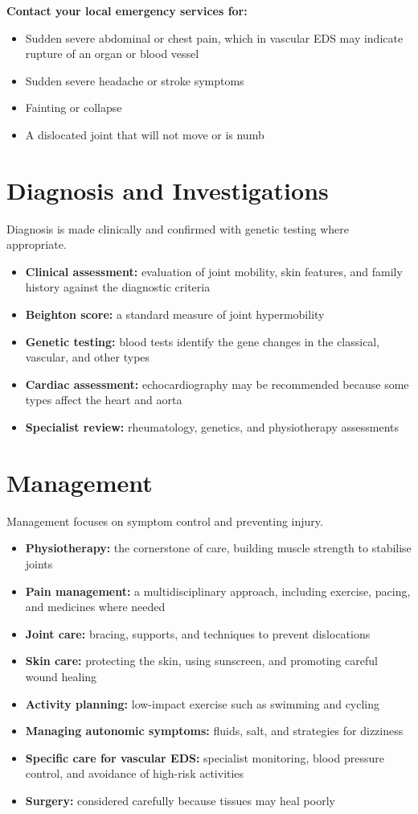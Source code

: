 \textbf{Contact your local emergency services for:}
\begin{itemize}
    \item Sudden severe abdominal or chest pain, which in vascular EDS may indicate rupture of an organ or blood vessel
    \item Sudden severe headache or stroke symptoms
    \item Fainting or collapse
    \item A dislocated joint that will not move or is numb
\end{itemize}

\section*{Diagnosis and Investigations}
Diagnosis is made clinically and confirmed with genetic testing where appropriate.
\begin{itemize}
    \item \textbf{Clinical assessment:} evaluation of joint mobility, skin features, and family history against the diagnostic criteria
    \item \textbf{Beighton score:} a standard measure of joint hypermobility
    \item \textbf{Genetic testing:} blood tests identify the gene changes in the classical, vascular, and other types
    \item \textbf{Cardiac assessment:} echocardiography may be recommended because some types affect the heart and aorta
    \item \textbf{Specialist review:} rheumatology, genetics, and physiotherapy assessments
\end{itemize}

\section*{Management}
Management focuses on symptom control and preventing injury.
\begin{itemize}
    \item \textbf{Physiotherapy:} the cornerstone of care, building muscle strength to stabilise joints
    \item \textbf{Pain management:} a multidisciplinary approach, including exercise, pacing, and medicines where needed
    \item \textbf{Joint care:} bracing, supports, and techniques to prevent dislocations
    \item \textbf{Skin care:} protecting the skin, using sunscreen, and promoting careful wound healing
    \item \textbf{Activity planning:} low-impact exercise such as swimming and cycling
    \item \textbf{Managing autonomic symptoms:} fluids, salt, and strategies for dizziness
    \item \textbf{Specific care for vascular EDS:} specialist monitoring, blood pressure control, and avoidance of high-risk activities
    \item \textbf{Surgery:} considered carefully because tissues may heal poorly
\end{itemize}

